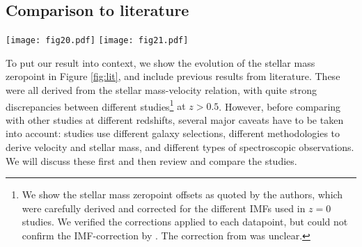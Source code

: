 \documentclass{emulateapj}
\begin{document}
{\subsection{Comparison to literature}
\label{sec:discuss1}

\begin{figure*}
\begin{center}
\texttt{[image: fig20.pdf]}
\texttt{[image: fig21.pdf]}
\caption{{T}he evolution of the stellar mass zeropoint with redshift. The {yellow} datapoint{s represent the observed evolution} from our survey at $2.0<z<2.5$ {for fixed slopes of 0.29 (left panel) or 1/4.5 (right panel)}. {Uncertainties are derived from bootstrap resampling and} {t}he horizontal error bar indicates the standard deviation of redshift in our sample. Results from other surveys (as quoted in the corresponding papers) are shown with symbols as indicated in the legend. {For studies that do not compare directly with \citet{Bell01} or \citet{Reyes11} we use gray symbols.} The magnitude of the systematic effects that we have corrected for are indicated by arrows, and we have also indicated {the magnitude of a factor 2 uncertainty in stellar mass with a vertical errorbar (M)}. We also show the predictions from semi-analytical models ({pink} lines).}
\label{fig:lit}
\end{center}
\end{figure*}

To put our result into context, we show the evolution of the stellar mass zeropoint in Figure \ref{fig:lit}, and include previous results from literature. These were all derived from the stellar mass-velocity relation, with quite strong discrepancies between different studies\footnote{We show the stellar mass zeropoint offsets as quoted by the authors, which were carefully derived and corrected for the different IMFs used in $z=0$ studies. We verified the corrections applied to each datapoint, but could not confirm the IMF-correction by \citet{Conselice05}. The correction from \citet{Vergani12} was unclear.} {at $z>0.5$}. However, before comparing with other studies at different redshifts, several major caveats have to be taken into account: studies use different galaxy selections, different methodologies to derive velocity and stellar mass, and different types of spectroscopic observations. We will discuss these first and then review and compare the studies.

}
\end{document}
